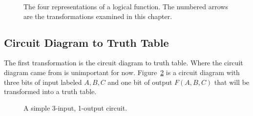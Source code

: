 \begin{figure}[ht]
\caption{The four representations of a logical function.  The
numbered arrows are the transformations examined in this chapter.}
\label{fig:forms}
\end{figure}

\subsection{Circuit Diagram to Truth Table}

The first transformation is the circuit diagram to truth table.  
Where the circuit diagram came from is unimportant for now.
Figure~\ref{fig:CD-TT} is a circuit diagram with three bits of 
input labeled $A,B,C$ and one bit of output $F(A,B,C)$ that will
be transformed into a truth table.

\begin{figure}[ht]
\caption{A simple 3-input, 1-output circuit.}
\label{fig:CD-TT}
\end{figure}

